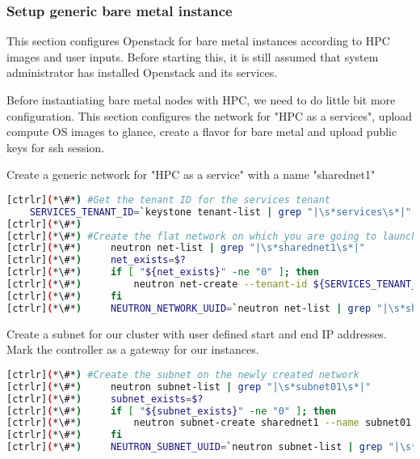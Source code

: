 \subsubsection{Setup generic bare metal instance}

	This section configures Openstack for bare metal instances according to HPC images and user inputs. Before starting this, it is still assumed that system administrator has installed Openstack and its services.

	Before instantiating bare metal nodes with HPC, we need to do little bit more configuration. This section configures the network for "HPC as a services", upload compute OS images to glance, create a flavor for bare metal and upload public keys for ssh session.

	Create a generic network for "HPC as a service" with a name "sharednet1"

\begin{lstlisting}[language=bash,keywords={}]
[ctrlr](*\#*) #Get the tenant ID for the services tenant
    SERVICES_TENANT_ID=`keystone tenant-list | grep "|\s*services\s*|" | awk '{print $2}'`
[ctrlr](*\#*) 
[ctrlr](*\#*) #Create the flat network on which you are going to launch instances
[ctrlr](*\#*)     neutron net-list | grep "|\s*sharednet1\s*|"
[ctrlr](*\#*)     net_exists=$?
[ctrlr](*\#*)     if [ "${net_exists}" -ne "0" ]; then
[ctrlr](*\#*)         neutron net-create --tenant-id ${SERVICES_TENANT_ID} sharednet1 --shared --provider:network_type flat --provider:physical_network physnet1
[ctrlr](*\#*)     fi
[ctrlr](*\#*)     NEUTRON_NETWORK_UUID=`neutron net-list | grep "|\s*sharednet1\s*|" | awk '{print $2}'`
\end{lstlisting}


	Create a subnet for our cluster with user defined start and end IP addresses. Mark the controller as a gateway for our instances.


\begin{lstlisting}[language=bash,keywords={}]
[ctrlr](*\#*) #Create the subnet on the newly created network
[ctrlr](*\#*)     neutron subnet-list | grep "|\s*subnet01\s*|"
[ctrlr](*\#*)     subnet_exists=$?
[ctrlr](*\#*)     if [ "${subnet_exists}" -ne "0" ]; then
[ctrlr](*\#*)         neutron subnet-create sharednet1 --name subnet01 --ip-version=4 --gateway=${controller_ip} --allocation-pool start=${cc_subnet_dhcp_start},end=${cc_subnet_dhcp_end} --enable-dhcp ${cc_subnet_cidr}
[ctrlr](*\#*)     fi
[ctrlr](*\#*)     NEUTRON_SUBNET_UUID=`neutron subnet-list | grep "|\s*subnet01\s*|" | awk '{print $2}'`
\end{lstlisting} 

